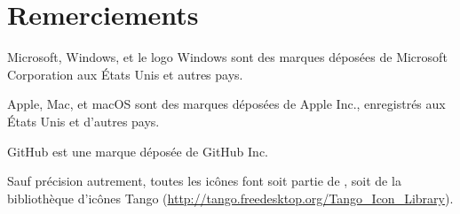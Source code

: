 
\chapter*{Remerciements}

Microsoft, Windows, et le logo Windows sont des marques déposées de Microsoft Corporation aux États Unis et autres pays.

Apple, Mac, et macOS sont des marques déposées de Apple Inc., enregistrés aux États Unis et d'autres pays.

GitHub est une marque déposée de GitHub Inc.

Sauf précision autrement, toutes les icônes font soit partie de \Tw, soit de la bibliothèque d'icônes Tango (\url{http://tango.freedesktop.org/Tango_Icon_Library}).

